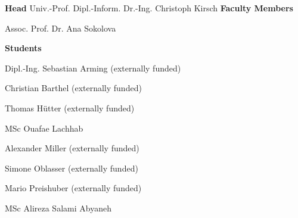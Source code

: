 \textcolor{\workinggroupboxtextcolor}{
	\textbf{Head}
	\newline
    \newline
	Univ.-Prof. Dipl.-Inform. Dr.-Ing. Christoph Kirsch
	\newline
    \newline
	\textbf{Faculty Members}
	\begin{compactitem}
	  \item Assoc. Prof. Dr. Ana Sokolova
	\end{compactitem}
	\vspace{0.5cm}
	\textbf{Students}
	\begin{compactitem}
	  \item Dipl.-Ing. Sebastian Arming (externally funded)
		\item Christian Barthel (externally funded)
	  \item Thomas Hütter (externally funded)
	  \item MSc Ouafae Lachhab
	  \item Alexander Miller (externally funded)
		\item Simone Oblasser (externally funded)
	  \item Mario Preishuber (externally funded)
	  \item MSc Alireza Salami Abyaneh
	\end{compactitem}
}